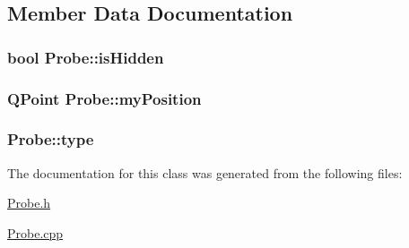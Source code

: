 \subsection{Member Data Documentation}
\hypertarget{class_probe_a70f4267a48449ffcaf533977713cf49c}{
\subsubsection[{is\+Hidden}]{\setlength{\rightskip}{0pt plus 5cm}bool Probe\+::is\+Hidden}}\label{class_probe_a70f4267a48449ffcaf533977713cf49c}
\hypertarget{class_probe_aec2e2de57497c0b53c150ec808089298}{
\subsubsection[{my\+Position}]{\setlength{\rightskip}{0pt plus 5cm}Q\+Point Probe\+::my\+Position}}\label{class_probe_aec2e2de57497c0b53c150ec808089298}
\hypertarget{class_probe_a73c39e8dfc343d288a2590b4c14e358c}{
\subsubsection[{type}]{ Probe\+::type}}\label{class_probe_a73c39e8dfc343d288a2590b4c14e358c}


The documentation for this class was generated from the following files\+:\begin{DoxyCompactItemize}
\item 
\hyperlink{_probe_8h}{Probe.\+h}\item 
\hyperlink{_probe_8cpp}{Probe.\+cpp}\end{DoxyCompactItemize}
